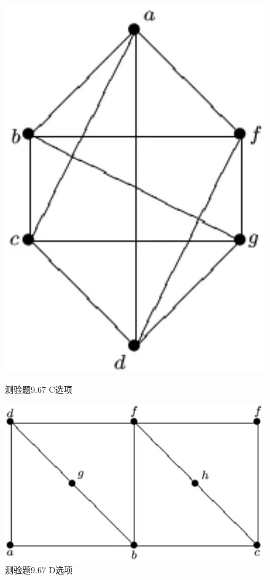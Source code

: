 \documentclass[UTF8, heading=true]{ctexart}
\begin{document}
\begin{figure}[H]
  \centering
  \begin{minipage}[t]{0.2\textwidth}
      \centering
      \includegraphics[width=1\textwidth]{9.67_3.jpg} %
      \vspace{-0.3cm}
      \caption{测验题9.67 C选项}
  \end{minipage}
  \hspace{0.22\textwidth} %
  \begin{minipage}[t]{0.35\textwidth}
      \centering
      \includegraphics[width=1\textwidth]{9.67_4.jpg} %
      \vspace{-0.3cm}
      \caption{测验题9.67 D选项}
\end{minipage}
\end{figure}
\end{document}
